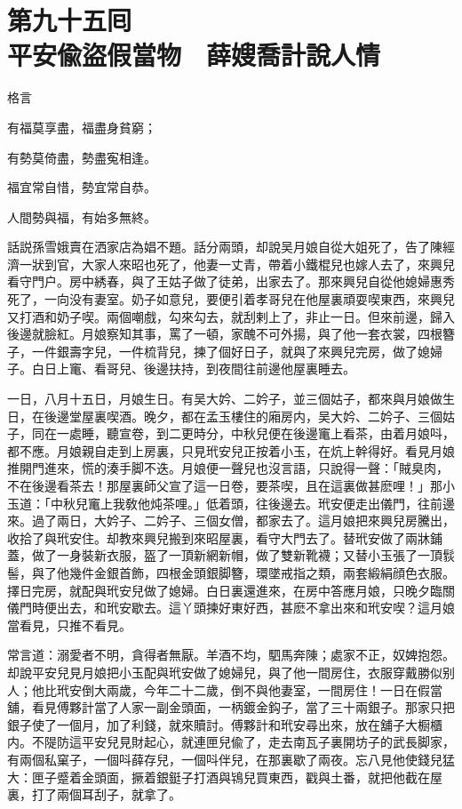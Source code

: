 
\chapter*{第九十五囘　\\平安偸盜假當物　薛嫂喬計說人情}


格言

\begin{myquote}
有福莫享盡，福盡身貧窮；

有勢莫倚盡，勢盡寃相逢。

福宜常自惜，勢宜常自恭。

人間勢與福，有始多無終。
\end{myquote}

話説孫雪娥賣在洒家店為娼不題。話分兩頭，却說吴月娘自從大姐死了，告了陳經濟一狀到官，大家人來昭也死了，他妻一丈青，帶着小鐵棍兒也嫁人去了，來興兒看守門户。房中綉春，與了王姑子做了徒弟，出家去了。那來興兒自從他媳婦惠秀死了，一向没有妻室。奶子如意兒，要便引着孝哥兒在他屋裏頑耍喫東西，來興兒又打酒和奶子喫。兩個嘲戲，勾來勾去，就刮剌上了，非止一日。但來前邊，歸入後邊就臉紅。月娘察知其事，罵了一頓，家醜不可外揚，與了他一套衣裳，四根簪子，一件銀壽字兒，一件梳背兒，揀了個好日子，就與了來興兒完房，做了媳婦子。白日上竃、看哥兒、後邊扶持，到夜間往前邊他屋裏睡去。

一日，八月十五日，月娘生日。有吴大妗、二妗子，並三個姑子，都來與月娘做生日，在後邊堂屋裏喫酒。晚夕，都在孟玉樓住的廂房内，吴大妗、二妗子、三個姑子，同在一處睡，聽宣卷，到二更時分，中秋兒便在後邊竃上看茶，由着月娘呌，都不應。月娘親自走到上房裏，只見玳安兒正按着小玉，在炕上幹得好。看見月娘推開門進來，慌的湊手脚不迭。月娘便一聲兒也沒言語，只說得一聲：「賊臭肉，不在後邊看茶去！那屋裏師父宣了這一日卷，要茶喫，且在這裏做甚麽哩！」那小玉道：「中秋兒竃上我敎他炖茶哩。」低着頭，往後邊去。玳安便走出儀門，往前邊來。過了兩日，大妗子、二妗子、三個女僧，都家去了。這月娘把來興兒房騰出，收拾了與玳安住。却教來興兒搬到來昭屋裏，看守大門去了。替玳安做了兩牀鋪蓋，做了一身裝新衣服，盔了一頂新網新帽，做了雙新靴襪；又替小玉張了一頂䯼髻，與了他幾件金銀首飾，四根金頭銀脚簪，環墜戒指之類，兩套緞絹顔色衣服。擇日完房，就配與玳安兒做了媳婦。白日裏還進來，在房中答應月娘，只晚夕臨關儀門時便出去，和玳安歇去。這丫頭揀好東好西，甚麽不拿出來和玳安喫？這月娘當看見，只推不看見。

常言道：溺愛者不明，貪得者無厭。羊酒不均，駟馬奔陳；處家不正，奴婢抱怨。却說平安兒見月娘把小玉配與玳安做了媳婦兒，與了他一間房住，衣服穿戴勝似别人；他比玳安倒大兩歲，今年二十二歲，倒不與他妻室，一間房住！一日在假當舖，看見傅夥計當了人家一副金頭面，一柄鍍金鈎子，當了三十兩銀子。那家只把銀子使了一個月，加了利錢，就來贖討。傅夥計和玳安尋出來，放在舖子大橱櫃内。不隄防這平安兒見財起心，就連匣兒偸了，走去南瓦子裏開坊子的武長脚家，有兩個私窠子，一個呌薛存兒，一個呌伴兒，在那裏歇了兩夜。忘八見他使錢兒猛大：匣子蹙着金頭面，撅着銀鋌子打酒與鴇兒買東西，戳與土番，就把他截在屋裏，打了兩個耳刮子，就拿了。


